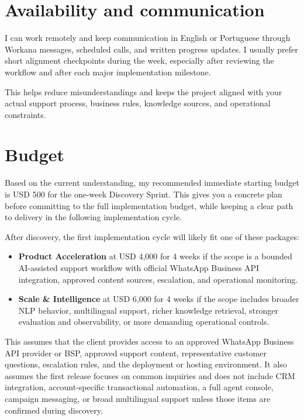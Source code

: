 \documentclass[11pt,a4paper]{article}
\begin{document}
\section*{Availability and communication}

I can work remotely and keep communication in English or Portuguese through Workana messages, scheduled calls, and written progress updates. I usually prefer short alignment checkpoints during the week, especially after reviewing the workflow and after each major implementation milestone.\par

This helps reduce misunderstandings and keeps the project aligned with your actual support process, business rules, knowledge sources, and operational constraints.\par

\section*{Budget}

Based on the current understanding, my recommended immediate starting budget is USD 500 for the one-week Discovery Sprint. This gives you a concrete plan before committing to the full implementation budget, while keeping a clear path to delivery in the following implementation cycle.\par

After discovery, the first implementation cycle will likely fit one of these packages:\par

\begin{itemize}
\item \textbf{Product Acceleration} at USD 4,000 for 4 weeks if the scope is a bounded AI-assisted support workflow with official WhatsApp Business API integration, approved content sources, escalation, and operational monitoring.
\item \textbf{Scale \& Intelligence} at USD 6,000 for 4 weeks if the scope includes broader NLP behavior, multilingual support, richer knowledge retrieval, stronger evaluation and observability, or more demanding operational controls.
\end{itemize}

This assumes that the client provides access to an approved WhatsApp Business API provider or BSP, approved support content, representative customer questions, escalation rules, and the deployment or hosting environment. It also assumes the first release focuses on common inquiries and does not include CRM integration, account-specific transactional automation, a full agent console, campaign messaging, or broad multilingual support unless those items are confirmed during discovery.\par
\end{document}
